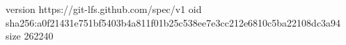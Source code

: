version https://git-lfs.github.com/spec/v1
oid sha256:a0f21431e751bf5403b4a811f01b25c538ee7e3cc212e6810c5ba22108dc3a94
size 262240
